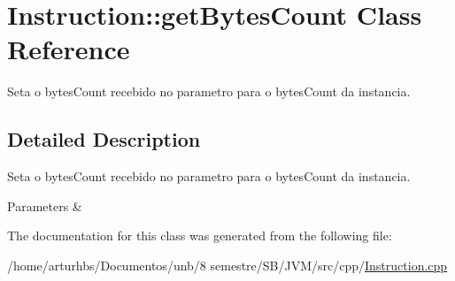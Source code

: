 \hypertarget{classInstruction_1_1getBytesCount}{}\section{Instruction\+:\+:get\+Bytes\+Count Class Reference}
\label{classInstruction_1_1getBytesCount}


Seta o bytes\+Count recebido no parametro para o bytes\+Count da instancia.  




\subsection{Detailed Description}
Seta o bytes\+Count recebido no parametro para o bytes\+Count da instancia. 


\begin{DoxyParams}{Parameters}
{\em } & \\
\hline
\end{DoxyParams}


The documentation for this class was generated from the following file\+:\begin{DoxyCompactItemize}
\item 
/home/arturhbs/\+Documentos/unb/8 semestre/\+S\+B/\+J\+V\+M/src/cpp/\hyperlink{Instruction_8cpp}{Instruction.\+cpp}\end{DoxyCompactItemize}
